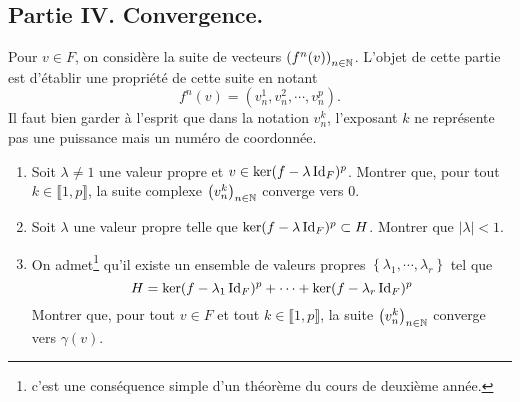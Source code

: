 \subsection*{Partie IV. Convergence.}
Pour $v \in F$, on considère la suite de vecteurs $\left( f^n(v)\right) _{n\in \mathbb{N}}$. L'objet de cette partie est d'établir une propriété de cette suite en notant
\[
 f^n(v) = \left(v^1_n,v^2_n,\cdots,v^p_n \right). 
\]
Il faut bien garder à l'esprit que dans la notation $v^k_n$, l'exposant $k$ ne représente pas une puissance mais un numéro de coordonnée.
\begin{enumerate}
 \item Soit $\lambda\neq 1$ une valeur propre et $v\in \ker (f -\lambda \operatorname{Id}_F)^p$.\newline
 Montrer que, pour tout $k \in \llbracket 1, p\rrbracket$, la suite complexe $\left( v^k_n\right) _{n\in \mathbb{N}}$ converge vers $0$.

 \item Soit $\lambda$ une valeur propre telle que $\ker (f -\lambda \operatorname{Id}_F)^p\subset H$. Montrer que $|\lambda|< 1$.

 \item On admet\footnote{c'est une conséquence simple d'un théorème du cours de deuxième année.} qu'il existe un ensemble de valeurs propres $\left\lbrace \lambda_1,\cdots,\lambda_r\right\rbrace$ tel que
\begin{displaymath}
 H = \ker (f -\lambda_1 \operatorname{Id}_F)^p + \cdots + \ker (f -\lambda_r \operatorname{Id}_F)^p
\end{displaymath}
 Montrer que, pour tout $v\in F$ et tout $k \in \llbracket 1,p \rrbracket$, la suite $\left( v^k_n\right) _{n\in \mathbb{N}}$ converge vers $\gamma(v)$. 
\end{enumerate}
 
